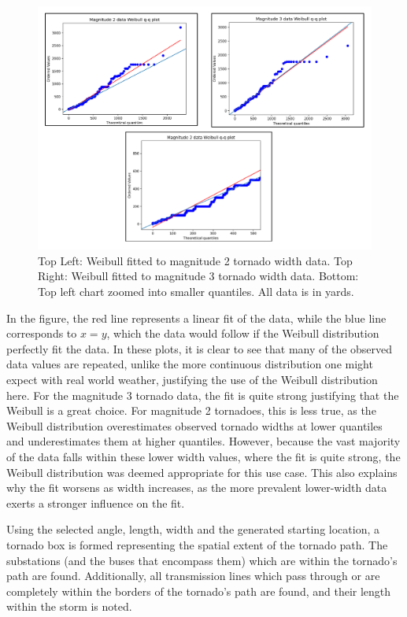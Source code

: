 \documentclass[12pt]{article}
\begin{document}
\begin{figure}[ht]
    \centering %
    \includegraphics[width=\textwidth]{WeibullDistribs.pdf}
    \caption[Fitted tornado width Q-Q plots]{Top Left: Weibull fitted to magnitude 2 tornado width data. Top Right: Weibull fitted to magnitude 3 tornado width data. Bottom: Top left chart zoomed into smaller quantiles. All data is in yards.}
    \label{fig:WeibullDistribs}
\end{figure}
In the figure, the red line represents a linear fit of the data, while the blue line corresponds to $x=y$, which the data would follow if the Weibull distribution perfectly fit the data. In these plots, it is clear to see that many of the observed data values are repeated, unlike the more continuous distribution one might expect with real world weather, justifying the use of the Weibull distribution here.  For the magnitude 3 tornado data, the fit is quite strong justifying that the Weibull is a great choice. For magnitude 2 tornadoes, this is less true, as the Weibull distribution overestimates observed tornado widths at lower quantiles and underestimates them at higher quantiles. However, because the vast majority of the data falls within these lower width values, where the fit is quite strong, the Weibull distribution was deemed appropriate for this use case. This also explains why the fit worsens as width increases, as the more prevalent lower-width data exerts a stronger influence on the fit. \par


Using the selected angle, length, width and the generated starting location, a tornado box is formed representing the spatial extent of the tornado path. The substations (and the buses that encompass them) which are within the tornado's path are found. Additionally, all transmission lines which pass through or are completely within the borders of the tornado's path are found, and their length within the storm is noted. \par
\end{document}
